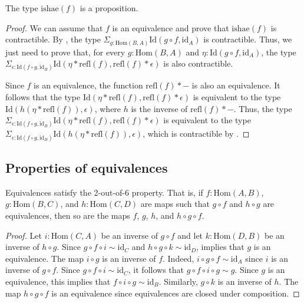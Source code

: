 \documentclass[reqno]{amsart}
\theoremstyle{definition}
\theoremstyle{remark}
\newcommand{\fs}[1]{\mathrm{#1}}
\newcommand{\Hom}{\fs{Hom}}
\newcommand{\Id}{\fs{Id}}
\newcommand{\refl}{\fs{refl}}
\newcommand{\id}{\fs{id}}
\numberwithin{figure}{section}
\begin{document}
\begin{prop}
The type $\fs{ishae}(f)$ is a proposition.
\end{prop}
\begin{proof}
We can assume that $f$ is an equivalence and prove that $\fs{ishae}(f)$ is contractible.
By , the type $\Sigma_{g : \Hom(B,A)} \Id(g \circ f, \id_A)$ is contractible.
Thus, we just need to prove that, for every $g : \Hom(B,A)$ and $\eta : \Id(g \circ f, \id_A)$, the type $\Sigma_{\epsilon : \Id(f \circ g, \id_B)} \Id(\eta * \refl(f), \refl(f) * \epsilon)$ is also contractible.

Since $f$ is an equivalence, the function $\refl(f) * -$ is also an equivalence.
It follows that the type $\Id(\eta * \refl(f), \refl(f) * \epsilon)$ is equivalent to the type $\Id(h(\eta * \refl(f)), \epsilon)$, where $h$ is the inverse of $\refl(f) * -$.
Thus, the type $\Sigma_{\epsilon : \Id(f \circ g, \id_B)} \Id(\eta * \refl(f), \refl(f) * \epsilon)$ is equivalent to the type $\Sigma_{\epsilon : \Id(f \circ g, \id_B)} \Id(h(\eta * \refl(f)), \epsilon)$, which is contractible by \cite[Lemma~3.11.8]{hottbook}.
\end{proof}

\subsection{Properties of equivalences}

\begin{prop}
Equivalences satisfy the 2-out-of-6 property.
That is, if $f : \Hom(A,B)$, $g : \Hom(B,C)$, and $h : \Hom(C,D)$ are maps such that $g \circ f$ and $h \circ g$ are equivalences, then so are the maps $f$, $g$, $h$, and $h \circ g \circ f$.
\end{prop}
\begin{proof}
Let $i : \Hom(C,A)$ be an inverse of $g \circ f$ and let $k : \Hom(D,B)$ be an inverse of $h \circ g$.
Since $g \circ f \circ i \sim \id_C$ and $h \circ g \circ k \sim \id_D$,  implies that $g$ is an equivalence.
The map $i \circ g$ is an inverse of $f$.
Indeed, $i \circ g \circ f \sim \id_A$ since $i$ is an inverse of $g \circ f$.
Since $g \circ f \circ i \sim \id_C$, it follows that $g \circ f \circ i \circ g \sim g$.
Since $g$ is an equivalence, this implies that $f \circ i \circ g \sim \id_B$.
Similarly, $g \circ k$ is an inverse of $h$.
The map $h \circ g \circ f$ is an equivalence since equivalences are closed under composition.
\end{proof}
\end{document}
